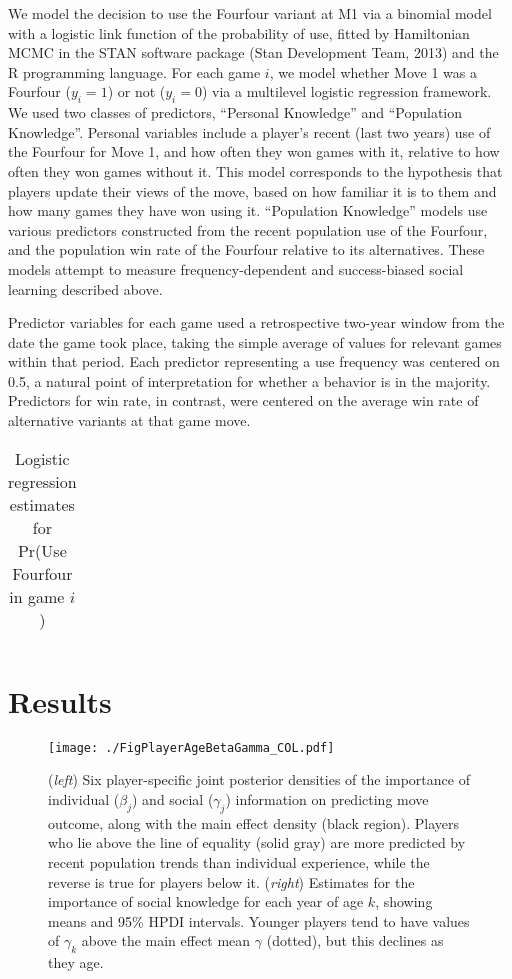 \documentclass{article}
\begin{document}
We model the decision to use the Fourfour variant at M1 via a binomial model with a logistic link function of the probability of use, fitted by Hamiltonian MCMC in the STAN software package (Stan Development Team, 2013) and the R programming language.  For each game $i$, we model whether Move 1 was a Fourfour ($y_i=1$) or not ($y_i=0$) via a multilevel logistic regression framework.  We used two classes of predictors, ``Personal Knowledge'' and ``Population Knowledge''.  Personal variables include a player's recent (last two years) use of the Fourfour for Move 1, and how often they won games with it, relative to how often they won games without it.  This model corresponds to the hypothesis that players update their views of the move, based on how familiar it is to them and how many games they have won using it.  ``Population Knowledge'' models use various predictors constructed from the recent population use of the Fourfour, and the population win rate of the Fourfour relative to its alternatives.  These models attempt to measure frequency-dependent and success-biased social learning described above.

Predictor variables for each game used a retrospective two-year window from the date the game took place, taking the simple average of values for relevant games within that period.  Each predictor representing a use frequency was centered on 0.5, a natural point of interpretation for whether a behavior is in the majority.  Predictors for win rate, in contrast, were centered on the average win rate of alternative variants at that game move.

\begin{table}[tbp]
  \centering
    \begin{tabular}{lrr}
	
    \end{tabular}%
	\caption{Logistic regression estimates for Pr(Use Fourfour in game $i$)}
 \end{table}%

\section{Results}

\begin{figure}[thp]
\begin{center} 
\texttt{[image: ./FigPlayerAgeBetaGamma\_COL.pdf]}
\caption{(\textit{left}) Six player-specific joint posterior densities of the importance of individual ($\beta_j$) and social ($\gamma_j$) information on predicting move outcome, along with the main effect density (black region).  Players who lie above the line of equality (solid gray) are more predicted by recent population trends than individual experience, while the reverse is true for players below it. (\textit{right}) Estimates for the importance of social knowledge for each year of age $k$, showing means and 95\% HPDI intervals.  Younger players tend to have values of $\gamma_k$ above the main effect mean $\gamma$ (dotted), but this declines as they age.}
\label{FigPlayerAgeBetaGamma}
\end{center}
\end{figure}
\end{document}
